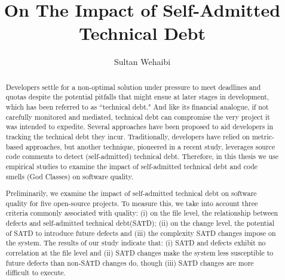 \documentclass[12pt]{report}
\author{Sultan Wehaibi}
\title {On The Impact of Self-Admitted Technical Debt}
\newcommand{\SATD}{self-admitted technical debt\xspace}
\begin{document}
\begin{abstract}
	
	

Developers settle for a non-optimal solution under pressure to meet deadlines and quotas despite the potential pitfalls that might ensue at later stages in development, which has been referred to as ``technical debt." And like its financial analogue, if not carefully monitored and mediated, technical debt can compromise the very project it was intended to expedite. Several approaches have been proposed to aid developers in tracking the technical debt they incur. Traditionally, developers have relied on metric-based approaches, but another technique, pioneered in a recent study, leverages source code comments to detect (self-admitted) technical debt. Therefore, in this thesis we use empirical studies to examine the impact of self-admitted technical debt and code smells (God Classes) on software quality.

Preliminarily, we examine the impact of \SATD on software quality for five open-source projects. To measure this, we take into account three criteria commonly associated with quality: (i) on the file level, the relationship between defects and \SATD (SATD); (ii) on the change level, the potential of SATD to introduce future defects and (iii) the complexity SATD changes impose on the system. The results of our study indicate that: (i) SATD and defects exhibit no correlation at the file level and (ii) SATD changes make the system less susceptible to future defects than non-SATD changes do, though (iii) SATD changes are more difficult to execute.


\end{abstract}
\end{document}

